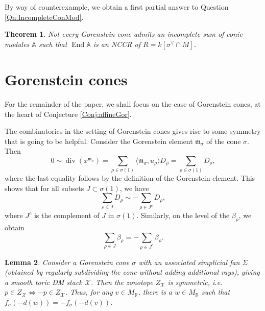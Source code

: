 \documentclass[reqno, 12pt]{amsart}
\newtheorem{theorem}{Theorem}[section]
\newtheorem{lemma}[theorem]{Lemma}
\theoremstyle{definition}
\numberwithin{equation}{section}
\newcommand{\R}{\mathbb{R}}
\newcommand{\End}{\operatorname{End}}
\begin{document}
\noindent By way of counterexample, we obtain a first partial answer to Question \ref{Qn:IncompleteConMod}. \begin{theorem}
    \label{Thm:Not always exist incomplete NCCR}
    Not every Gorenstein cone admits an incomplete sum of conic modules $\mathbb{A}$ such that $\End\mathbb{A}$ is an NCCR of $R=k[\sigma^\vee\cap M]$.
\end{theorem}





\section{Gorenstein cones}\label{sec:Gor}
For the remainder of the paper, we shall focus on the case of Gorenstein cones, at the heart of Conjecture \ref{Conj:affineGor}.


The combinatorics in the setting of Gorenstein cones gives rise to some symmetry that is going to be helpful. Consider the Gorenstein element $\mathfrak{m}_\sigma$ of the cone $\sigma$. Then \[
0\sim \operatorname{div}(x^{\mathfrak{m}_\sigma})=\sum_{\rho\in \sigma(1)}\langle \mathfrak{m}_\sigma,u_\rho\rangle D_\rho=\sum_{\rho\in\sigma(1)}D_\rho,
\]
where the last equality follows by the definition of the Gorenstein element. This shows that for all subsets $J\subset \sigma(1)$, we have\begin{equation}
    \label{eq:SymmetryGorJDIV}
    \sum_{\rho\in J}D_\rho\sim -\sum_{\rho\in J^c}D_\rho,
\end{equation}
where $J^c$ is the complement of $J$ in $\sigma(1)$. Similarly, on the level of the $\beta_\rho$, we obtain\begin{equation}
\label{eq:GorSymBeta}
    \sum_{\rho\in J}\beta_\rho=-\sum_{\rho\in J^c}\beta_\rho.
\end{equation}

\begin{lemma}
    \label{Lem:ZonoIsSymmetric}
    Consider a Gorenstein cone $\sigma$ with an associated simplicial fan $\Sigma$ (obtained by regularly subdividing the cone without adding additional rays), giving a smooth toric DM stack $\mathcal{X}$. Then the zonotope $Z_{\mathcal{X}}$ is symmetric, i.e. $p\in Z_\mathcal{X}\Leftrightarrow -p\in Z_\mathcal{X}$. Thus, for any $v\in M_\R$, there is a $w\in M_\R$ such that $f_\sigma(-d(w))=-f_\sigma(-d(v))$.
\end{lemma}
\end{document}
